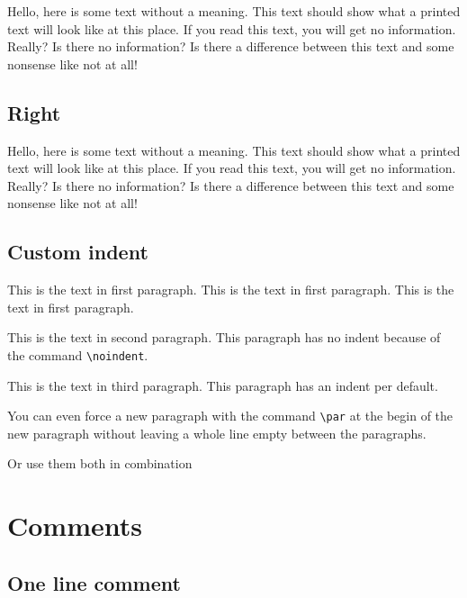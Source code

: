 \documentclass{article}				%
\begin{document}
\begin{flushleft}
	Hello, here is some text without a meaning.  This text should show what 
	a printed text will look like at this place.  If you read this text, 
	you will get no information.  Really?  Is there no information?  Is there 
	a difference between this text and some nonsense like not at all!
\end{flushleft}

\subsection{Right}

\begin{flushright}
	Hello, here is some text without a meaning.  This text should show what 
	a printed text will look like at this place.  If you read this text, 
	you will get no information.  Really?  Is there no information?  Is there 
	a difference between this text and some nonsense like not at all!
\end{flushright}

\subsection{Custom indent}

This is the text in first paragraph. This is the text in first 
paragraph. This is the text in first paragraph.

\noindent %
This is the text in second paragraph. This paragraph has no indent because of the command \verb|\noindent|.

This is the text in third paragraph. This paragraph has an indent per default.
\par You can even force a new paragraph with the command \verb|\par| at the begin of the new paragraph without leaving a whole line empty between the paragraphs.
\par\noindent
Or use them both in combination

\section{Comments}

\subsection{One line comment}

\end{document}
